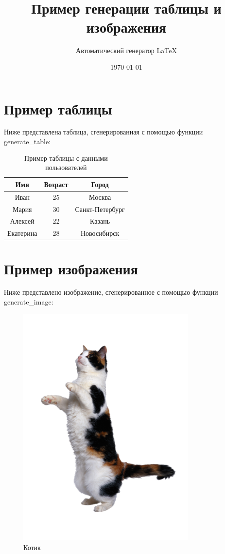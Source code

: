 \documentclass{article}
\title{Пример генерации таблицы и изображения}
\author{Автоматический генератор LaTeX}
\date{\today}
\begin{document}
\maketitle

\section{Пример таблицы}

Ниже представлена таблица, сгенерированная с помощью функции generate\_table:

\begin{table}[h]
\centering
\begin{tabular}{|c|c|c|}
\hline
Имя & Возраст & Город \\
\hline
Иван & 25 & Москва \\
\hline
Мария & 30 & Санкт-Петербург \\
\hline
Алексей & 22 & Казань \\
\hline
Екатерина & 28 & Новосибирск \\
\hline
\end{tabular}
\caption{Пример таблицы с данными пользователей}
\label{tab:users}
\end{table}

\section{Пример изображения}

Ниже представлено изображение, сгенерированное с помощью функции generate\_image:

\begin{figure}[h]
\centering
\includegraphics[width=0.8\textwidth]{cat.png}
\caption{Котик}
\label{fig:cat}
\end{figure}
\end{document}
